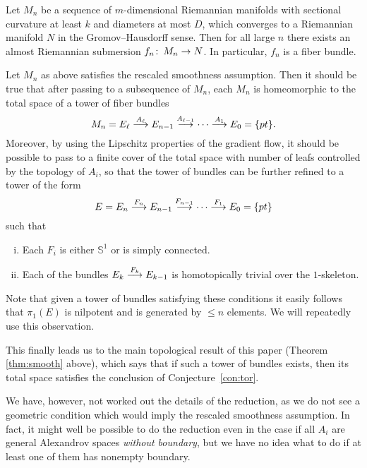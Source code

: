 \documentclass{amsart}
\begin{document}
\begin{thm}
Let $M_n$ be a sequence of $m$-dimensional Riemannian manifolds with sectional curvature at least $k$ 
and diameters at most $D$, which converges to a Riemannian manifold $N$ in the Gromov--Hausdorff sense.
Then for all large $n$ there exists an almost Riemannian submersion $f_n\colon\thinspace M_n\to N$.
In particular, $f_n$ is a fiber bundle.
\end{thm}

Let $M_n$ as above satisfies the rescaled smoothness assumption.
Then it should be true that after passing to a subsequence of $M_n$,
each $M_n$ is homeomorphic to the total space of a tower of fiber bundles
\[
M_n=E_\ell\buildrel {A_\ell}\over \longrightarrow E_{n-1}\buildrel {A_{\ell-1}}\over\longrightarrow\dots\buildrel {A_1}\over\longrightarrow E_0=\{pt\}.
\]
Moreover, by using the Lipschitz properties of the gradient flow,
it should be possible to pass to a finite cover of the total space with number of leafs 
controlled by the topology of $A_i$, so that the tower of bundles can be
further refined  to a tower of the form
\[
E=E_n\buildrel {F_n}\over \longrightarrow E_{n-1}\buildrel {F_{n-1}}\over\longrightarrow\dots\buildrel {F_1}\over\longrightarrow E_0=\{pt\}
\]
such that
\begin{enumerate}[(i)]
\item Each $F_i$ is either $\mathbb{S}^{1}$ or is simply connected. 
\item Each of the bundles $E_k\buildrel {F_k}\over \longrightarrow E_{k-1}$ is homotopically trivial over the $1$-skeleton. 
\end{enumerate}
Note that given a tower of bundles satisfying these conditions it easily follows that $\pi_1(E)$ is nilpotent and is generated by $\le n$ elements.
We will repeatedly use this observation.

This finally leads us to the main topological result of this paper (Theorem \ref{thm:smooth} above),
which says that if such a tower of bundles exists, then its total space satisfies the conclusion of Conjecture~\ref{con:tor}.

We have, however, not worked out the details of the reduction, 
as we do not see a geometric condition which would imply the rescaled smoothness assumption.
In fact, it might  well be possible to do the reduction even in the case if all $A_i$ are general  Alexandrov spaces  \emph{without  boundary}, but we have no idea what to do if at least one of them has nonempty boundary.
\end{document}
